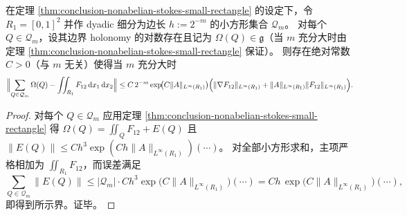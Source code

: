 \begin{corollary}\label{cor:conclusion-nonabelian-dyadic-stokes-certificate}
在定理 \ref{thm:conclusion-nonabelian-stokes-small-rectangle} 的设定下，令 \(R_1=[0,1]^2\) 并作 dyadic 细分为边长 \(h:=2^{-m}\) 的小方形集合 \(\mathcal Q_m\)。
对每个 \(Q\in\mathcal Q_m\)，设其边界 holonomy 的对数存在且记为 \(\Omega(Q)\in\mathfrak g\)（当 \(m\) 充分大时由定理 \ref{thm:conclusion-nonabelian-stokes-small-rectangle} 保证）。
则存在绝对常数 \(C>0\)（与 \(m\) 无关）使得当 \(m\) 充分大时
\[
\Bigl\|\sum_{Q\in\mathcal Q_m}\Omega(Q)-\iint_{R_1}F_{12}\,\mathrm d x_1\,\mathrm d x_2\Bigr\|
\le
C\,2^{-m}\exp\!\bigl(C\|A\|_{L^\infty(R_1)}\bigr)
\Bigl(
\|\nabla F_{12}\|_{L^\infty(R_1)}+\|A\|_{L^\infty(R_1)}\|F_{12}\|_{L^\infty(R_1)}
\Bigr).
\]
\end{corollary}
\begin{proof}
对每个 \(Q\in\mathcal Q_m\) 应用定理 \ref{thm:conclusion-nonabelian-stokes-small-rectangle} 得
\(
\Omega(Q)=\iint_QF_{12}+E(Q)
\)
且 \(\|E(Q)\|\le C h^3\exp(C h\|A\|_{L^\infty(R_1)})(\cdots)\)。
对全部小方形求和，主项严格相加为 \(\iint_{R_1}F_{12}\)，而误差满足
\[
\sum_{Q\in\mathcal Q_m}\|E(Q)\|
\le
|\mathcal Q_m|\cdot C h^3\exp\!\bigl(C\|A\|_{L^\infty(R_1)}\bigr)(\cdots)
=C h\,\exp\!\bigl(C\|A\|_{L^\infty(R_1)}\bigr)(\cdots),
\]
即得到所示界。证毕。
\end{proof}



